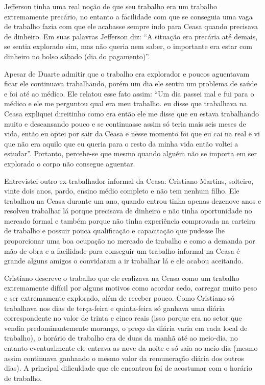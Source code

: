  Jefferson tinha uma real noção de que seu trabalho era um trabalho extremamente precário, no entanto
 a facilidade com que se conseguia uma vaga de trabalho fazia com que ele acabasse sempre indo para
 Ceasa quando precisava de dinheiro. Em suas palavras Jefferson diz: “A situação era precária até demais,
 se sentia explorado sim, mas não queria nem saber, o importante era estar com dinheiro no bolso sábado
 (dia do pagamento)”.

 Apesar de Duarte admitir que o trabalho era explorador e poucos aguentavam ficar ele continuava 
 trabalhando, porém um dia ele sentiu um problema de saúde e foi até ao médico. Ele relatou esse fato
 assim: ``Um dia passei mal e fui para o médico e ele me perguntou qual era meu trabalho. eu disse que 
 trabalhava na Ceasa expliquei direitinho como era então ele me disse que eu estava trabalhando muito 
 e descansando pouco e se continuasse assim só teria mais seis meses de vida, então eu optei por sair 
 da Ceasa e nesse momento foi que eu cai na real e vi que não era aquilo que eu queria para o resto da 
 minha vida então voltei a estudar''. Portanto, percebe-se que mesmo quando alguém não se importa em ser
 explorado o corpo não consegue aguentar.

 Entrevistei outro ex-trabalhador informal da Ceasa: Cristiano Martins, solteiro, vinte dois anos, 
 pardo, ensino médio completo e não tem nenhum filho. Ele trabalhou na Ceasa durante um ano, quando 
 entrou tinha apenas dezenove anos e resolveu trabalhar lá porque precisava de dinheiro e não tinha 
 oportunidade no mercado formal e também porque não tinha experiência comprovada na carteira de trabalho
 e possuir pouca qualificação e capacitação que pudesse lhe proporcionar uma boa ocupação no mercado de
 trabalho e como a demanda por mão de obra e a facilidade para conseguir um trabalho informal na Ceasa
 é grande alguns amigos o convidaram a ir trabalhar lá e ele acabou aceitando.

 
 Cristiano descreve o trabalho que ele realizava na Ceasa como um trabalho extremamente difícil por 
 alguns motivos como acordar cedo, carregar muito peso e ser extremamente explorado, além de receber 
 pouco. Como Cristiano só trabalhava nos dias de terça-feira e quinta-feira só ganhava uma diária 
 correspondente no valor de trinta e cinco reais (isso porque era no setor que vendia predominantemente 
 morango, o preço da diária varia em cada local de trabalho), o horário de trabalho era de duas da manhã 
 até ao meio-dia, no entanto eventualmente ele entrava as nove da noite e só saia ao meio-dia (mesmo 
 assim continuava ganhando o mesmo valor da remuneração diária dos outros dias). A principal dificuldade
 que ele encontrou foi de acostumar com o horário de trabalho.

